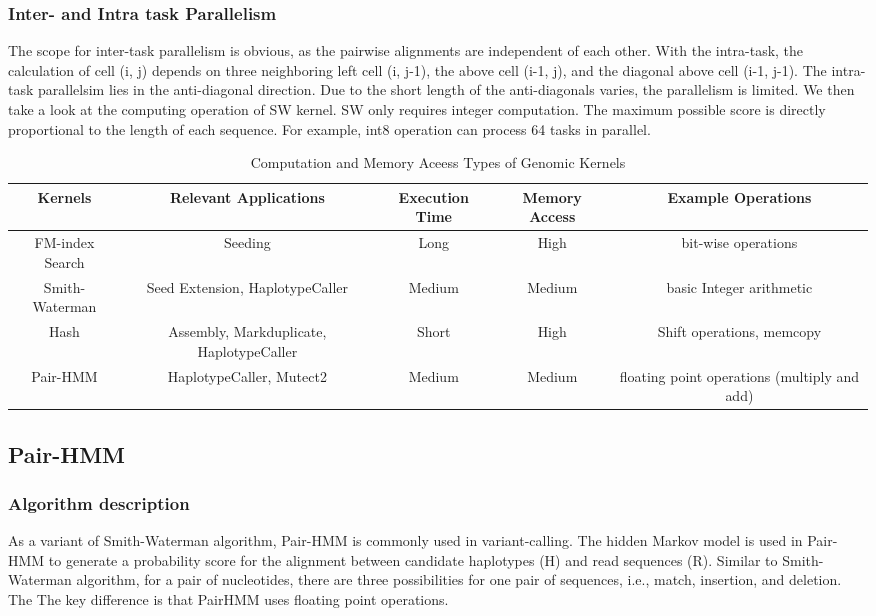 \subsubsection{Inter- and Intra task Parallelism}
The scope for inter-task parallelism is obvious, as the pairwise alignments are independent of each other. With the intra-task, the calculation of cell (i, j) depends on three neighboring left cell (i, j-1), the above cell (i-1, j), and the diagonal above cell (i-1, j-1). The intra-task parallelsim lies in the anti-diagonal direction. Due to the short length of the anti-diagonals varies, the parallelism is limited. We then take a look at the computing operation of SW kernel. SW  only requires integer computation. The maximum possible score is directly proportional to the length of each sequence. For example, int8 operation can process 64 tasks in parallel.

\begin{table*}[t]
\centering
\caption{Computation and Memory Aceess Types of Genomic Kernels}
\fontsize{8}{10}\selectfont
\begin{tabular}{ |c|c|c|c|c| } 
\hline
\bf{Kernels} & \bf{Relevant Applications} & \bf{Execution Time} & \bf{Memory Access} & \bf{Example Operations} \\
\hline
FM-index Search & Seeding & Long & High & bit-wise operations \\
\hline
Smith-Waterman & Seed Extension, HaplotypeCaller & Medium & Medium & basic Integer arithmetic \\
\hline
Hash & Assembly, Markduplicate, HaplotypeCaller & Short & High & Shift operations, memcopy \\
\hline
Pair-HMM & HaplotypeCaller, Mutect2 & Medium & Medium & floating point operations (multiply and add) \\
\hline
\end{tabular}
\label{tab:time-breakdown}
\end{table*}

\subsection{Pair-HMM}
\subsubsection{Algorithm description}
As a variant of Smith-Waterman algorithm, Pair-HMM is commonly used in variant-calling. The hidden Markov model is used in Pair-HMM to generate a probability score for the alignment between candidate haplotypes (H) and read sequences (R). Similar to Smith-Waterman algorithm, for a pair of nucleotides, there are three possibilities for one pair of sequences, i.e., match, insertion, and deletion. The The key difference is that PairHMM uses floating point operations.


